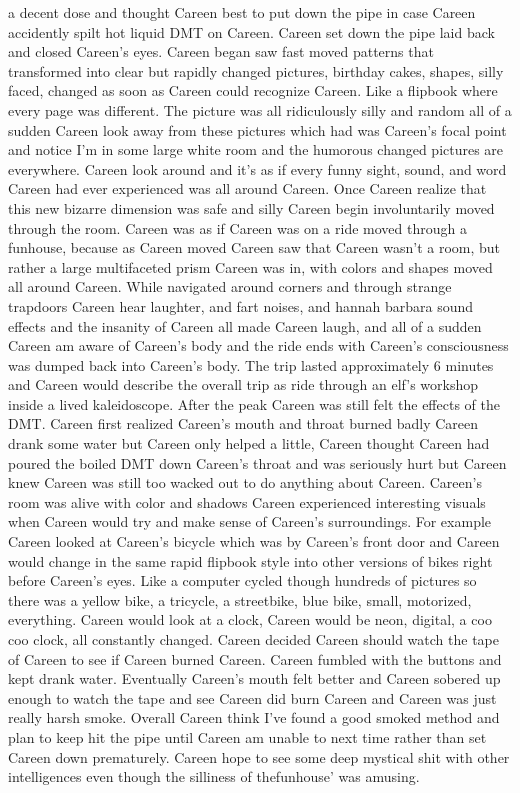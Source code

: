 \documentclass[12pt]{book}
\begin{document}
a decent dose and thought Careen best to put down the pipe in case Careen accidently spilt hot liquid DMT on Careen. Careen set down the pipe laid back and closed Careen's eyes. Careen began saw fast moved patterns that transformed into clear but rapidly changed pictures, birthday cakes, shapes, silly faced, changed as soon as Careen could recognize Careen. Like a flipbook where every page was different. The picture was all ridiculously silly and random all of a sudden Careen look away from these pictures which had was Careen's focal point and notice I'm in some large white room and the humorous changed pictures are everywhere. Careen look around and it's as if every funny sight, sound, and word Careen had ever experienced was all around Careen. Once Careen realize that this new bizarre dimension was safe and silly Careen begin involuntarily moved through the room. Careen was as if Careen was on a ride moved through a funhouse, because as Careen moved Careen saw that Careen wasn't a room, but rather a large multifaceted prism Careen was in, with colors and shapes moved all around Careen. While navigated around corners and through strange trapdoors Careen hear laughter, and fart noises, and hannah barbara sound effects and the insanity of Careen all made Careen laugh, and all of a sudden Careen am aware of Careen's body and the ride ends with Careen's consciousness was dumped back into Careen's body. The trip lasted approximately 6 minutes and Careen would describe the overall trip as ride through an elf's workshop inside a lived kaleidoscope. After the peak Careen was still felt the effects of the DMT. Careen first realized Careen's mouth and throat burned badly Careen drank some water but Careen only helped a little, Careen thought Careen had poured the boiled DMT down Careen's throat and was seriously hurt but Careen knew Careen was still too wacked out to do anything about Careen. Careen's room was alive with color and shadows Careen experienced interesting visuals when Careen would try and make sense of Careen's surroundings. For example Careen looked at Careen's bicycle which was by Careen's front door and Careen would change in the same rapid flipbook style into other versions of bikes right before Careen's eyes. Like a computer cycled though hundreds of pictures so there was a yellow bike, a tricycle, a streetbike, blue bike, small, motorized, everything. Careen would look at a clock, Careen would be neon, digital, a coo coo clock, all constantly changed. Careen decided Careen should watch the tape of Careen to see if Careen burned Careen. Careen fumbled with the buttons and kept drank water. Eventually Careen's mouth felt better and Careen sobered up enough to watch the tape and see Careen did burn Careen and Careen was just really harsh smoke. Overall Careen think I've found a good smoked method and plan to keep hit the pipe until Careen am unable to next time rather than set Careen down prematurely. Careen hope to see some deep mystical shit with other intelligences even though the silliness of thefunhouse' was amusing.
\end{document}
